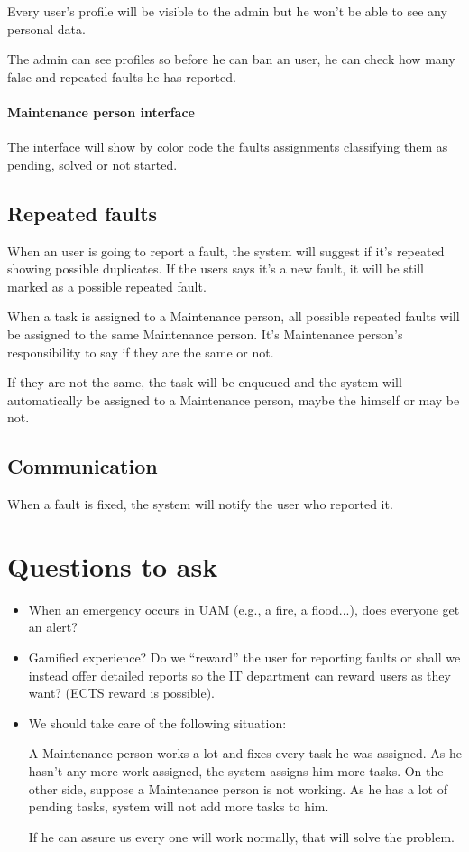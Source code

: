 Every user's profile will be visible to the admin but he won't be able to see any personal data.

The admin can see profiles so before he can ban an user, he can check how many false and repeated faults he has reported.


\paragraph{Maintenance person interface}
The interface will show by color code the faults assignments classifying them as pending, solved or not started.

\subsection{Repeated faults}
When an user is going to report a fault, the system will suggest if it's repeated showing possible duplicates. If the users says it's a new fault, it will be still marked as a possible repeated fault.

When a task is assigned to a Maintenance person, all possible repeated faults will be assigned to the same Maintenance person. It's Maintenance person's responsibility to say if they are the same or not.

If they are not the same, the task will be enqueued and the system will automatically be assigned to a Maintenance person, maybe the himself or may be not.


\subsection{Communication}

When a fault is fixed, the system will notify the user who reported it.

\section{Questions to ask}

\begin{itemize}
\item When an emergency occurs in UAM (e.g., a fire, a flood...), does everyone get an alert?
\item Gamified experience? Do we ``reward'' the user for reporting faults or shall we instead offer detailed reports so the IT department can reward users as they want? (ECTS reward is possible).
\item We should take care of the following situation:

A Maintenance person works a lot and fixes every task he was assigned. As he hasn't any more work assigned, the system assigns him more tasks. On the other side, suppose a Maintenance person is not working. As he has a lot of pending tasks, system will not add more tasks to him. 

If he can assure us every one will work normally, that will solve the problem.
\end{itemize}

